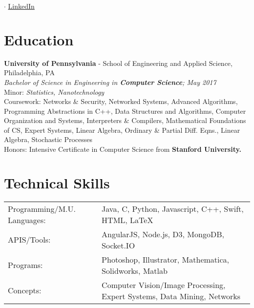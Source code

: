 \documentclass[a4paper, 10pt]{article}
\begin{document}
\pagestyle{empty}   %

\par{\par}

\par{ $\cdot$ \href{https://www.linkedin.com/in/jtcho}{LinkedIn} \par}
\bigskip


\section{Education}
\textbf{University of Pennsylvania} - School of Engineering and Applied Science, Philadelphia, PA\\
\textit{Bachelor of Science in Engineering in \textbf{Computer Science}; May 2017}\\
Minor: \textit{Statistics, Nanotechnology}\\
Coursework: Networks \& Security, Networked Systems, Advanced Algorithms, Programming Abstractions in C++, Data Structures and Algorithms, Computer Organization and Systems, Interpreters \& Compilers, Mathematical Foundations of CS, Expert Systems, Linear Algebra, Ordinary \& Partial Diff. Eqns., Linear Algebra, Stochastic Processes\\
Honors: Intensive Certificate in Computer Science from \textbf{Stanford University.}

\section{Technical Skills}
\begin{tabular}{l l}
    Programming/M.U. Languages:&Java, C, Python, Javascript, C++, Swift, HTML, \LaTeX\\
               APIS/Tools:&AngularJS, Node.js, D3, MongoDB, Socket.IO\\
                 Programs:&Photoshop, Illustrator, Mathematica, Solidworks, Matlab\\
                 Concepts:&Computer Vision/Image Processing, Expert Systems, Data Mining, Networks
\end{tabular}
\end{document}
